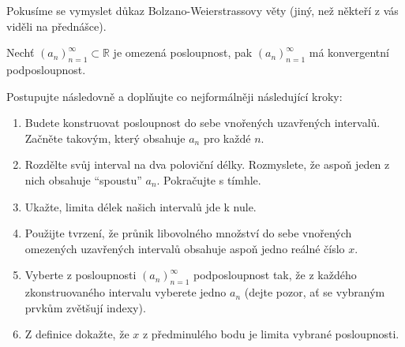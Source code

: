 Pokusíme se vymyslet důkaz Bolzano-Weierstrassovy věty (jiný, než někteří z vás viděli na přednášce).
\begin{theorem}
	Nechť $(a_n)_{n = 1}^{\infty} \subset \mathbb{R}$ je omezená posloupnost, pak $(a_n)_{n = 1}^{\infty}$ má konvergentní podposloupnost.
	\label{thm:bolzanoWeierstrass}
\end{theorem}

Postupujte následovně a doplňujte co nejformálněji následující kroky:
\begin{enumerate}
	\item  Budete konstruovat posloupnost do sebe vnořených uzavřených intervalů. Začněte takovým, který obsahuje $a_n$ pro každé $n$.
	\item  Rozdělte svůj interval na dva poloviční délky. Rozmyslete, že aspoň jeden z nich obsahuje ``spoustu'' $a_n$. Pokračujte s tímhle.
	\item  Ukažte, limita délek našich intervalů jde k nule.
	\item  Použijte tvrzení, že průnik libovolného množství do sebe vnořených omezených uzavřených intervalů obsahuje aspoň jedno reálné číslo $x$.
	\item  Vyberte z posloupnosti $(a_n)_{n = 1}^{\infty}$ podposloupnost tak, že z každého zkonstruovaného intervalu vyberete jedno $a_n$ (dejte pozor, ať se vybraným prvkům zvětšují indexy).
	\item  Z definice dokažte, že $x$ z předminulého bodu je limita vybrané posloupnosti.
\end{enumerate}

